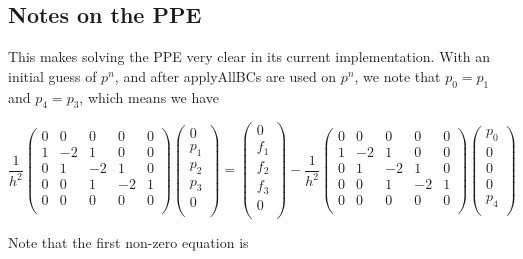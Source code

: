 \documentclass[11pt]{article}
\begin{document}
\subsection{Notes on the PPE}
This makes solving the PPE very clear in its current implementation. With an initial guess of $p^n$, and after applyAllBCs are used on $p^n$, we note that $p_0=p_1$ and $p_4=p_3$, which means we have

\begin{equation}
\frac{1}{h^2}
 \begin{pmatrix}
  0 &  0 &  0 &  0 &  0 \\
  1 & -2 &  1 &  0 &  0 \\
  0 &  1 & -2 &  1 &  0 \\
  0 &  0 &  1 & -2 &  1 \\
  0 &  0 &  0 &  0 &  0 \\
 \end{pmatrix}
 \begin{pmatrix}
  0 \\  p_1 \\  p_2 \\  p_3 \\  0 \\
 \end{pmatrix}
  =
 \begin{pmatrix}
  0 \\  f_1 \\  f_2 \\  f_3 \\  0 \\
 \end{pmatrix}
   -
\frac{1}{h^2}
 \begin{pmatrix}
  0 &  0 &  0 &  0 &  0 \\
  1 & -2 &  1 &  0 &  0 \\
  0 &  1 & -2 &  1 &  0 \\
  0 &  0 &  1 & -2 &  1 \\
  0 &  0 &  0 &  0 &  0 \\
 \end{pmatrix}
 \begin{pmatrix}
  p_0 \\  0 \\  0 \\  0 \\  p_4 \\
 \end{pmatrix}
\end{equation}

Note that the first non-zero equation is
\end{document}
